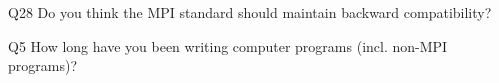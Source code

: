 \begin{description}%
\item{Q28} Do you think the MPI standard should maintain backward compatibility?%
\item{Q5} How long have you been writing computer programs (incl. non-MPI programs)?%
\end{description}%
